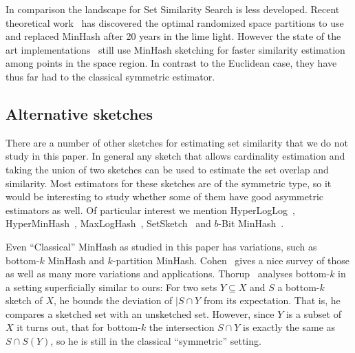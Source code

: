 In comparison the landscape for Set Similarity Search is less developed.
Recent theoretical work~\cite{christiani2017set, DBLP:conf/focs/AhleK20} has discovered the optimal randomized space partitions to use and replaced MinHash after 20 years in the lime light.
However the state of the art implementations~\cite{christiani2018scalable} still use MinHash sketching for faster similarity estimation among points in the space region.
In contrast to the Euclidean case, they have thus far had to the classical symmetric estimator.



\subsection{Alternative sketches}

There are a number of other sketches for estimating set similarity that we do not study in this paper.
In general any sketch that allows cardinality estimation and taking the union of two sketches can be used to estimate the set overlap and similarity.
Most estimators for these sketches are of the symmetric type, so it would be interesting to study whether some of them have good asymmetric estimators as well.
Of particular interest we mention HyperLogLog~\cite{flajolet2007hyperloglog}, HyperMinHash~\cite{yu2020hyperminhash}, MaxLogHash~\cite{wang2019memory}, SetSketch~\cite{DBLP:journals/corr/abs-2101-00314} and $b$-Bit MinHash~\cite{li2010b}.

Even ``Classical'' MinHash as studied in this paper has variations, such as bottom-$k$ MinHash and $k$-partition MinHash. Cohen~\cite{DBLP:reference/algo/Cohen16b} gives a nice survey of those as well as many more variations and applications.
Thorup~\cite{thorup2013bottom} analyses bottom-$k$ in a setting superficially similar to ours: For two sets $Y\subseteq X$ and $S$ a bottom-$k$ sketch of $X$, he bounds the deviation of $|S\cap Y$ from its expectation.
That is, he compares a sketched set with an unsketched set.
However, since $Y$ is a subset of $X$ it turns out, that for bottom-$k$ the intersection $S\cap Y$ is exactly the same as $S\cap S(Y)$, so he is still in the classical ``symmetric'' setting.


